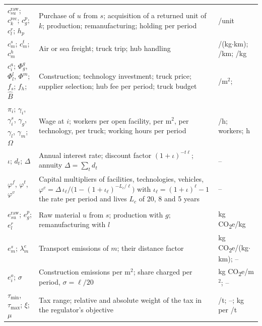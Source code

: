 \documentclass[review,11pt,nonatbib]{elsarticle}
\theoremstyle{remark}
\newcommand{\tmin}{\tau_{\min}}
\newcommand{\tmax}{\tau_{\max}}
\newcommand{\EUR}{\texteuro}
\newcommand{\CO}{CO\textsubscript{2}e}
\begin{document}
\begin{table}[!htbp]
\begin{tabularx}{\textwidth}{@{}>{\raggedright\arraybackslash}p{3.3cm}L>{\raggedright\arraybackslash}p{2.6cm}@{}}
$c^{\mathrm{raw}}_{su}$; $c^{\mathrm{rec}}_k$; $c^{p}_g$; $c^{r}_l$; $h_p$ & Purchase of $u$ from $s$; acquisition of a returned unit of $k$; production; remanufacturing; holding per period & \EUR/unit \\
$c^{s}_m$; $c^{t}_m$; $c^{h}_m$ & Air or sea freight; truck trip; hub handling & \EUR/(kg$\cdot$km); \EUR/km; \EUR/kg \\
$c^{a}_i$; $\Phi^{g}_g$, $\Phi^{l}_l$, $\Phi^{m}$; $f_s$; $f_h$; $\hat{B}$ & Construction; technology investment; truck price; supplier selection; hub fee per period; truck budget & \EUR/m$^2$; \EUR \\
$\pi_i$; $\gamma_i$, $\gamma^{s}_i$, $\gamma_g$, $\gamma_l$, $\gamma_m$; $\Omega$ & Wage at $i$; workers per open facility, per m$^2$, per technology, per truck; working hours per period & \EUR/h; workers; h \\
$\iota$; $d_t$; $\Delta$ & Annual interest rate; discount factor $(1+\iota)^{-t\ell}$; annuity $\Delta = \sum_t d_t$ & -- \\
$\varphi^{f}$, $\varphi^{t}$, $\varphi^{v}$ & Capital multipliers of facilities, technologies, vehicles, $\varphi^c = \Delta\, \iota_\ell / \bigl(1 - (1+\iota_\ell)^{-L_c/\ell}\bigr)$ with $\iota_\ell = (1+\iota)^\ell - 1$ the rate per period and lives $L_c$ of 20, 8 and 5 years & -- \\
 \\
$e^{\mathrm{raw}}_{su}$; $e^{p}_g$; $e^{r}_l$ & Raw material $u$ from $s$; production with $g$; remanufacturing with $l$ & kg \CO/kg \\
$e^{s}_m$; $\lambda^{e}_m$ & Transport emissions of $m$; their distance factor & kg \CO/(kg$\cdot$km); -- \\
$e^{o}_i$; $\sigma$ & Construction emissions per m$^2$; share charged per period, $\sigma = \ell/20$ & kg \CO/m$^2$; -- \\
$\tmin$, $\tmax$; $\xi$; $\mu$ & Tax range; relative and absolute weight of the tax in the regulator's objective & \EUR/t; --; kg per \EUR/t \\
\bottomrule
\end{tabularx}
\end{table}
\end{document}
